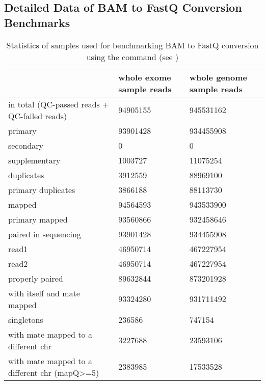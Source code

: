 \subsection{Detailed Data of BAM to FastQ Conversion Benchmarks}
\begin{table}[H]
\centering
\caption[Statistics of samples used for benchmarking BAM to FastQ conversion using the command samtools flagstat]{Statistics of samples used for benchmarking BAM to FastQ conversion using the command  (see \autocite{GenomeResearchLimited2022})}
\label{table:bam2fastq_benchmark_sample_stats}
\small
\begin{tabularx}{\textwidth}{Xyy}
\toprule
& whole exome sample reads & whole genome sample reads \\ \midrule
in total (QC-passed reads + QC-failed reads) & \num{94905155} & \num{945531162} \\
primary & \num{93901428} & \num{934455908} \\
secondary & \num{0} & \num{0} \\
supplementary & \num{1003727} & \num{11075254} \\
duplicates & \num{3912559} & \num{88969100} \\
primary duplicates & \num{3866188} & \num{88113730} \\
mapped & \num{94564593} & \num{943533900} \\
primary mapped & \num{93560866} & \num{932458646} \\
paired in sequencing & \num{93901428} & \num{934455908} \\
read1 & \num{46950714} & \num{467227954} \\
read2 & \num{46950714} & \num{467227954} \\
properly paired & \num{89632844} & \num{873201928} \\
with itself and mate mapped & \num{93324280} & \num{931711492} \\
singletons & \num{236586} & \num{747154} \\
with mate mapped to a different chr & \num{3227688} & \num{23593106} \\
with mate mapped to a different chr (mapQ\textgreater{}=5) & \num{2383985} & \num{17533528} \\
\bottomrule
\end{tabularx}
\end{table}

